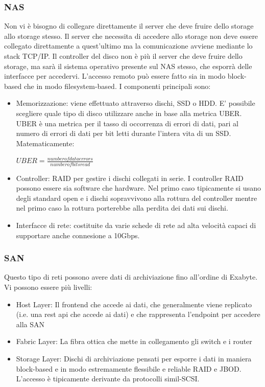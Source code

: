 \documentclass{article}
\begin{document}
		\subsubsection{NAS}
		Non vi è bisogno di collegare direttamente il server che deve fruire dello storage allo storage stesso. Il server che necessita di accedere allo storage non deve essere collegato direttamente a quest'ultimo ma la comunicazione avviene mediante lo stack TCP/IP. Il controller del disco non è più il server che deve fruire dello storage, ma sarà il sistema operativo presente sul NAS stesso, che esporrà delle interfacce per accedervi. L’accesso remoto può essere fatto sia in modo block-based che in modo filesystem-based.
		I componenti principali sono:
		\begin{itemize}
		    \item Memorizzazione: viene effettuato attraverso dischi, SSD o HDD.
		    E' possibile scegliere quale tipo di disco utilizzare anche in base alla metrica UBER.\\
		    UBER è una metrica per il tasso di occorrenza di errori di dati, pari al numero di errori di dati per bit letti durante l'intera vita di un SSD. Matematicamente:
		    \begin{center}
		     $ UBER= \frac{number of data errors}{number of bits read}$
		    \end{center}
		    \item Controller: RAID per gestire i dischi collegati in serie. I controller RAID possono essere sia software che hardware. Nel primo caso tipicamente si usano degli standard open e i dischi sopravvivono alla rottura del controller mentre nel primo caso la rottura porterebbe alla perdita dei dati sui dischi.
		    \item Interfacce di rete: costituite da varie schede di rete ad alta velocità capaci di supportare anche connesione a 10Gbps.
		\end{itemize}
		\subsubsection{SAN}
		Questo tipo di reti possono avere dati di archiviazione fino all'ordine di Exabyte. Vi possono essere più livelli:
		\begin{itemize}
		    \item Host Layer: Il frontend che accede ai dati, che generalmente viene replicato (i.e. una rest api che accede ai dati) e che rappresenta l’endpoint per accedere alla SAN
		    \item Fabric Layer: La fibra ottica che mette in collegamento gli switch e i router
		    \item Storage Layer: Dischi di archiviazione pensati per esporre i dati in maniera block-based e in modo estremamente flessibile e reliable RAID e JBOD. L’accesso è tipicamente derivante da protocolli simil-SCSI.
		\end{itemize}
\end{document}
